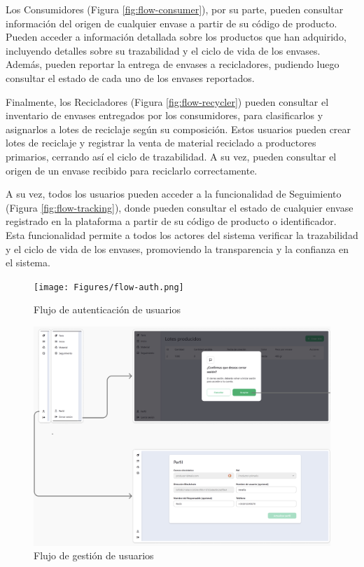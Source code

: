 Los Consumidores (Figura \ref{fig:flow-consumer}), por su parte, pueden consultar información del origen de cualquier envase a partir de su código de producto. Pueden acceder a información detallada sobre los productos que han adquirido, incluyendo detalles sobre su trazabilidad y el ciclo de vida de los envases. Además, pueden reportar la entrega de envases a recicladores, pudiendo luego consultar el estado de cada uno de los envases reportados.

Finalmente, los Recicladores (Figura \ref{fig:flow-recycler}) pueden consultar el inventario de envases entregados por los consumidores, para clasificarlos y asignarlos a lotes de reciclaje según su composición. Estos usuarios pueden crear lotes de reciclaje y registrar la venta de material reciclado a productores primarios, cerrando así el ciclo de trazabilidad. A su vez, pueden consultar el origen de un envase recibido para reciclarlo correctamente.

A su vez, todos los usuarios pueden acceder a la funcionalidad de Seguimiento (Figura \ref{fig:flow-tracking}), donde pueden consultar el estado de cualquier envase registrado en la plataforma a partir de su código de producto o identificador. Esta funcionalidad permite a todos los actores del sistema verificar la trazabilidad y el ciclo de vida de los envases, promoviendo la transparencia y la confianza en el sistema.

\begin{figure}[!htb]
	\centering
	\texttt{[image: Figures/flow-auth.png]}
	\caption{Flujo de autenticación de usuarios}
  \label{fig:flow-auth}
\end{figure}

\begin{figure}[!htb]
	\centering
	\includegraphics[width=\linewidth]{Figures/flow-user.png}
	\caption{Flujo de gestión de usuarios}
  \label{fig:flow-user}
\end{figure}

